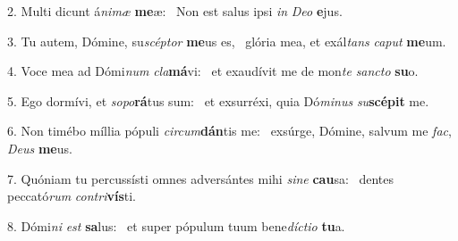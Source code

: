 2. Multi dicunt á\textit{ni}\textit{mæ} \textbf{me}æ: \ast\  Non est salus ipsi \textit{in} \textit{De}\textit{o} \textbf{e}jus.\

3. Tu autem, Dómine, su\textit{scép}\textit{tor} \textbf{me}us es, \ast\  glória mea, et exál\textit{tans} \textit{ca}\textit{put} \textbf{me}um.\

4. Voce mea ad Dómi\textit{num} \textit{cla}\textbf{má}vi: \ast\  et exaudívit me de mon\textit{te} \textit{sanc}\textit{to} \textbf{su}o.\

5. Ego dormívi, et \textit{so}\textit{po}\textbf{rá}tus sum: \ast\  et exsurréxi, quia Dó\textit{mi}\textit{nus} \textit{su}\textbf{scé}\textbf{pit} me.\

6. Non timébo míllia pópuli \textit{cir}\textit{cum}\textbf{dán}tis me: \ast\  exsúrge, Dómine, salvum me \textit{fac}, \textit{De}\textit{us} \textbf{me}us.\

7. Quóniam tu percussísti omnes adversántes mihi \textit{si}\textit{ne} \textbf{cau}sa: \ast\  dentes peccató\textit{rum} \textit{con}\textit{tri}\textbf{vís}ti.\

8. Dómi\textit{ni} \textit{est} \textbf{sa}lus: \ast\  et super pópulum tuum bene\textit{díc}\textit{ti}\textit{o} \textbf{tu}a.\

